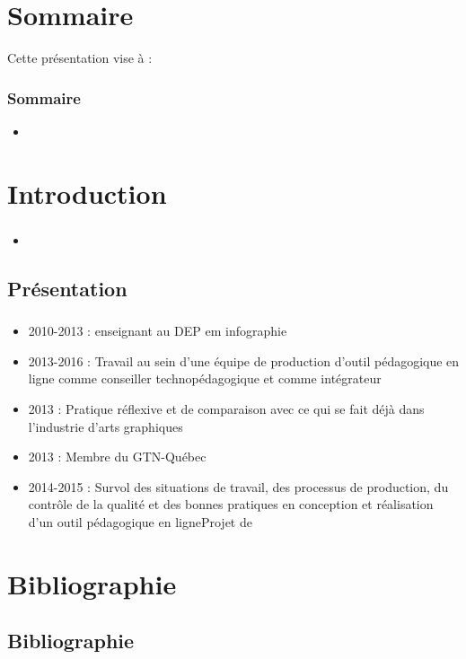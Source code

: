 	
	
	\frame{\titlepage} 
	\usebackgroundtemplate{ } 
	\section{Sommaire} 
		\begin{frame}
			Cette présentation vise à :
			\frametitle{Sommaire}
			\begin {itemize}
				\item 
			\end{itemize}
		\end{frame}


	\section{Introduction} 
		\begin{frame}[allowframebreaks]
			\frametitle{}
			\begin {itemize}
				\item 
			\end{itemize}
		\end{frame}
		
	\subsection{Présentation} 
		\begin{frame}[allowframebreaks]
			\frametitle{}
			\begin {itemize}
				
                                \item 2010-2013 : enseignant au DEP em  infographie
                                \item 2013-2016 : Travail au sein d’une équipe de production d’outil pédagogique en ligne comme conseiller technopédagogique et comme intégrateur
                                \item 2013 : Pratique réflexive et de comparaison avec ce qui se fait déjà dans l’industrie d’arts graphiques
                                \item 2013 : Membre du GTN-Québec
                                \item 2014-2015 : Survol des situations de travail, des processus de production, du contrôle de la qualité et des bonnes pratiques en conception et réalisation d’un outil pédagogique en ligneProjet de   
			\end{itemize}
		\end{frame}
			


\section{Bibliographie}
\subsection{Bibliographie}


